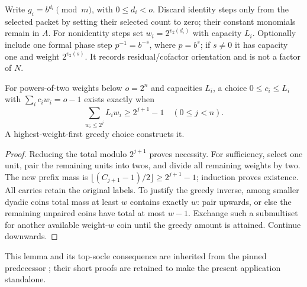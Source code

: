 Write $g_i=b^{d_i}\pmod m$, with $0\le d_i<o$. Discard identity steps only
from the selected packet by setting their selected count to zero; their
constant monomials remain in $A$. For nonidentity steps set
$w_i=2^{v_2(d_i)}$ with capacity $L_i$.
Optionally include one formal phase step $p^{-1}=b^{-s}$, where $p=b^s$;
if $s\ne0$ it has capacity one and weight $2^{v_2(s)}$.
It records residual/cofactor orientation and is not a factor of $N$.

\begin{lemma}
For powers-of-two weights below $o=2^n$ and capacities $L_i$, a choice
$0\le c_i\le L_i$ with $\sum_i c_iw_i=o-1$ exists exactly when
\[
 \boxed{\sum_{w_i\le2^j}L_iw_i\ge2^{j+1}-1
 \quad(0\le j<n).}                                       \tag{C3}
\]
A highest-weight-first greedy choice constructs it.
\end{lemma}
\begin{proof}
Reducing the total modulo $2^{j+1}$ proves necessity. For sufficiency,
select one unit, pair the remaining units into twos, and divide all remaining
weights by two. The new prefix mass is
$\lfloor(C_{j+1}-1)/2\rfloor\ge2^{j+1}-1$; induction proves existence.
All carries retain the original labels. To justify the greedy inverse,
among smaller dyadic coins total mass at least $w$ contains exactly $w$:
pair upwards, or else the remaining unpaired coins have total at most $w-1$.
Exchange such a submultiset for another available weight-$w$ coin until the
greedy amount is attained. Continue downwards.
\end{proof}
This lemma and its top-socle consequence are inherited from the pinned
predecessor \cite[Section 3, Lemma 1 and Theorem 2]{Prior}; their short proofs
are retained to make the present application standalone.

